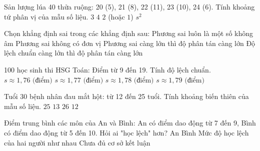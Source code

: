 \begin{ex}
	Sản lượng lúa 40 thửa ruộng: 20 (5), 21 (8), 22 (11), 23 (10), 24 (6). Tính khoảng tứ phân vị của mẫu số liệu.
	\choice
	{$3$}
	{$4$}
	{\True $2$ (hoặc $1$)}
	{$s^2$}
\end{ex}

\begin{ex}
	Chọn khẳng định sai trong các khẳng định sau:
	\choice
	{Phương sai luôn là một số không âm}
	{\True Phương sai không có đơn vị}
	{Phương sai càng lớn thì độ phân tán càng lớn}
	{Độ lệch chuẩn càng lớn thì độ phân tán càng lớn}
\end{ex}

\begin{ex}
	100 học sinh thi HSG Toán: Điểm từ 9 đến 19. Tính độ lệch chuẩn.
	\choice
	{$s \approx 1{,}76\text{ (điểm)}$}
	{\True $s \approx 1{,}77\text{ (điểm)}$}
	{$s \approx 1{,}78\text{ (điểm)}$}
	{$s \approx 1{,}79\text{ (điểm)}$}
\end{ex}

\begin{ex}
	Tuổi 30 bệnh nhân đau mắt hột: từ 12 đến 25 tuổi. Tính khoảng biến thiên của mẫu số liệu.
	\choice
	{$25$}
	{\True $13$}
	{$26$}
	{$12$}
\end{ex}

\begin{ex}
	Điểm trung bình các môn của An và Bình: An có điểm dao động từ 7 đến 9, Bình có điểm dao động từ 5 đến 10. Hỏi ai "học lệch" hơn?
	\choice
	{An}
	{\True Bình}
	{Mức độ học lệch của hai người như nhau}
	{Chưa đủ cơ sở kết luận}
\end{ex}

